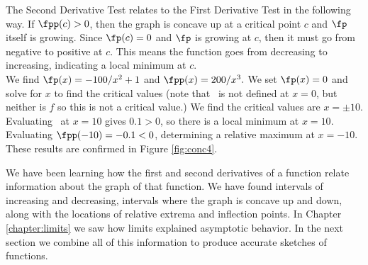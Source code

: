 
The Second Derivative Test relates to the First Derivative Test in the following way. If $\fpp(c)>0$, then the graph is concave up at a critical point $c$ and $\fp$ itself is growing.  Since $\fp(c)=0$ and $\fp$ is growing at $c$, then it must go from negative to positive at $c$.  This means the function goes from decreasing to increasing, indicating a local minimum at $c$.\\
\clearpage
{}
{We find $\fp(x)=-100/x^2+1$ and $\fpp(x) = 200/x^3.$  We set $\fp(x)=0$ and solve for $x$ to find the critical values (note that \fp\ is not defined at $x=0$, but neither is $f$ so this is not a critical value.) We find  the critical values are $x=\pm 10$.  Evaluating \fpp\ at $x=10$ gives $0.1>0$, so there is a local minimum at $x=10$.  Evaluating $\fpp(-10)=-0.1<0$, determining a relative maximum at  $x=-10$. These results are confirmed in Figure \ref{fig:conc4}.
}\\


We have been learning how the first and second derivatives of a function relate information about the graph of that function. We have found intervals of increasing and decreasing, intervals where the graph is concave up and down, along with the locations of relative extrema and inflection points. In Chapter \ref{chapter:limits} we saw how limits explained asymptotic behavior. In the next section we combine all of this information to produce accurate sketches of functions.


